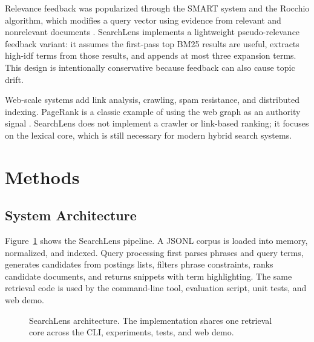 \documentclass[sigconf,nonacm]{acmart}
\begin{document}
Relevance feedback was popularized through the SMART system and the Rocchio algorithm, which modifies a query vector using evidence from relevant and nonrelevant documents \cite{rocchio1971feedback}. SearchLens implements a lightweight pseudo-relevance feedback variant: it assumes the first-pass top BM25 results are useful, extracts high-idf terms from those results, and appends at most three expansion terms. This design is intentionally conservative because feedback can also cause topic drift.

Web-scale systems add link analysis, crawling, spam resistance, and distributed indexing. PageRank is a classic example of using the web graph as an authority signal \cite{brin1998pagerank}. SearchLens does not implement a crawler or link-based ranking; it focuses on the lexical core, which is still necessary for modern hybrid search systems.

\section{Methods}
\subsection{System Architecture}
Figure~\ref{fig:architecture} shows the SearchLens pipeline. A JSONL corpus is loaded into memory, normalized, and indexed. Query processing first parses phrases and query terms, generates candidates from postings lists, filters phrase constraints, ranks candidate documents, and returns snippets with term highlighting. The same retrieval code is used by the command-line tool, evaluation script, unit tests, and web demo.

\begin{figure}[t]
\centering
{}
\caption{SearchLens architecture. The implementation shares one retrieval core across the CLI, experiments, tests, and web demo.}
\label{fig:architecture}
\end{figure}
\end{document}
